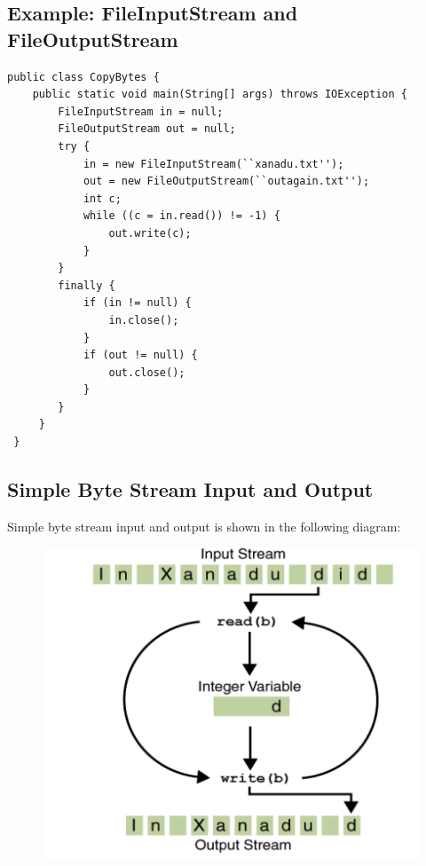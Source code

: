 \documentclass[11pt,a4paper]{article}
\begin{document}
\subsection*{Example: FileInputStream and FileOutputStream}
\begin{lstlisting}
public class CopyBytes { 
    public static void main(String[] args) throws IOException { 
        FileInputStream in = null; 
        FileOutputStream out = null; 
        try { 
            in = new FileInputStream(``xanadu.txt''); 
            out = new FileOutputStream(``outagain.txt''); 
            int c; 
            while ((c = in.read()) != -1) { 
                out.write(c); 
            } 
        } 
        finally { 
            if (in != null) { 
                in.close();
            } 
            if (out != null) {
                out.close();
            }
        } 
     }
 } 
 \end{lstlisting}

 \subsection*{Simple Byte Stream Input and Output}
 Simple byte stream input and output is shown in the following diagram: 


 \begin{center}
     \begin{figure}[H]
         \includegraphics[scale = 0.7]{ByteStream.png}
     \end{figure}
 \end{center}
\end{document}
